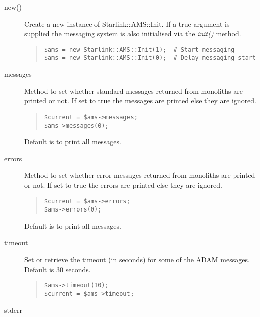 \documentclass[twoside,11pt]{article}
\newenvironment{myquote}{\begin{quote}\begin{small}}{\end{small}\end{quote}}
\renewcommand{\_}{\texttt{\symbol{95}}}
\begin{document}
\begin{description}

\item[new()] \mbox{}

Create a new instance of Starlink::AMS::Init.
If a true argument is supplied the messaging system is also
initialised via the {\em init()\/} method.

\begin{myquote}
\begin{verbatim}
$ams = new Starlink::AMS::Init(1);  # Start messaging
$ams = new Starlink::AMS::Init(0);  # Delay messaging start
\end{verbatim}
\end{myquote}


\item[messages] \mbox{}

Method to set whether standard messages returned from monoliths
are printed or not. If set to true the messages are printed
else they are ignored.

\begin{myquote}
\begin{verbatim}
$current = $ams->messages;
$ams->messages(0);
\end{verbatim}
\end{myquote} %

Default is to print all messages.

\item[errors] \mbox{}

Method to set whether error messages returned from monoliths
are printed or not. If set to true the errors are printed
else they are ignored.
\begin{myquote}
\begin{verbatim}
$current = $ams->errors;
$ams->errors(0);
\end{verbatim}
\end{myquote} %

Default is to print all messages.

\item[timeout] \mbox{}

Set or retrieve the timeout (in seconds) for some of the ADAM messages.
Default is 30 seconds.
\begin{myquote}
\begin{verbatim}
$ams->timeout(10);
$current = $ams->timeout;
\end{verbatim}
\end{myquote} %

\item[stderr] \mbox{}


\end{description}
\end{document}

